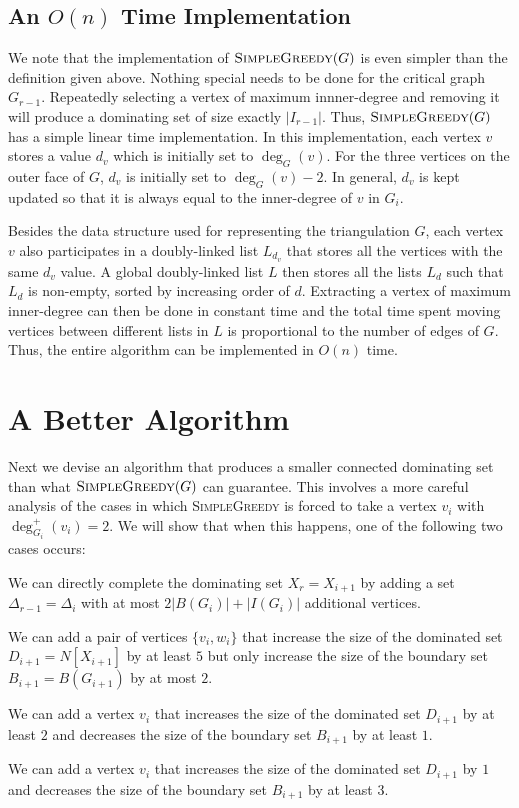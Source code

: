 \documentclass[12pt]{article}
\theoremstyle{definition}
\begin{document}
\subsection{An $O(n)$ Time Implementation}

We note that the implementation of $\textsc{SimpleGreedy}(G)$ is even simpler than the definition given above.  Nothing special needs to be done for the critical graph $G_{r-1}$.  Repeatedly selecting a vertex of maximum innner-degree and removing it will produce a dominating set of size exactly $|I_{r-1}|$.  Thus, $\textsc{SimpleGreedy}(G)$ has a simple linear time implementation.  In this implementation, each vertex $v$ stores a value $d_v$ which is initially set to $\deg_G(v)$.  For the three vertices on the outer face of $G$, $d_v$ is initially set to $\deg_G(v)-2$.  In general, $d_v$ is kept updated so that it is always equal to the inner-degree of $v$ in $G_i$.

Besides the data structure used for representing the triangulation $G$, each vertex $v$ also participates in a doubly-linked list $L_{d_v}$  that stores all the vertices with the same $d_v$ value.  A global doubly-linked list $L$ then stores all the lists $L_d$ such that $L_d$ is non-empty, sorted by increasing order of $d$.   Extracting a vertex of maximum inner-degree can then be done in constant time and the total time spent moving vertices between different lists in $L$ is proportional to the number of edges of $G$. Thus, the entire algorithm can be implemented in $O(n)$ time.

\section{A Better Algorithm}
\label{full_result}

Next we devise an algorithm that produces a smaller connected dominating set than what $\textsc{SimpleGreedy}(G)$ can guarantee.  This involves a more careful analysis of the cases in which \textsc{SimpleGreedy} is forced to take a vertex $v_i$ with $\deg^+_{G_i}(v_i)=2$.  We will show that when this happens, one of the following two cases occurs:
\begin{compactenum}
  \item We can directly complete the dominating set $X_r=X_{i+1}$ by adding a set $\Delta_{r-1}=\Delta_i$ with at most $2|B(G_i)|+|I(G_i)|$ additional vertices.
  \item We can add a pair of vertices $\{v_i,w_i\}$ that increase the size of the dominated set $D_{i+1}=N[X_{i+1}]$ by at least $5$ but only increase the size of the boundary set $B_{i+1}=B(G_{i+1})$ by at most $2$.
  \item We can add a vertex $v_i$ that increases the size of the dominated set $D_{i+1}$ by at least $2$ and decreases the size of the boundary set $B_{i+1}$ by at least $1$.
  \item We can add a vertex $v_i$ that increases the size of the dominated set $D_{i+1}$ by $1$ and decreases the size of the boundary set $B_{i+1}$ by at least $3$.

\end{compactenum}
\end{document}
